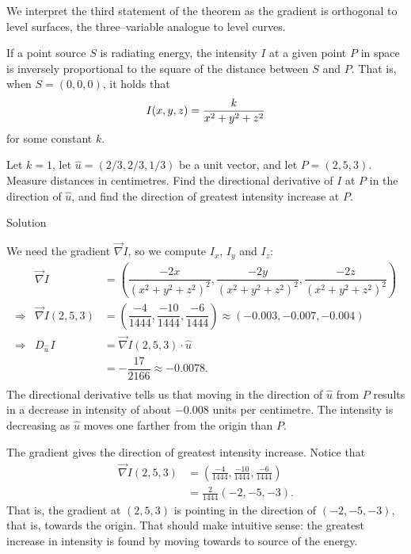 We interpret the third statement of the theorem as the gradient is orthogonal to level surfaces, the three--variable analogue to level curves.



\fi

\begin{example}\label{ex_direct5}
If a point source $S$ is radiating energy, the intensity $I$ at a given point $P$ in space is inversely proportional to the square of the distance between $S$ and $P$. That is, when $S=(0,0,0)$, it holds that \linebreak $$\displaystyle I(x,y,z) = \frac{k}{x^2+y^2+z^2}$$ for some constant $k$.

Let $k=1$, let $\hat u = \left( 2/3, 2/3, 1/3\right)$ be a unit vector, and let $P = (2,5,3).$ Measure distances in centimetres. Find the directional derivative of $I$ at $P$ in the direction of $\hat u$, and find the direction of greatest intensity increase at $P$.

Solution 

We need the gradient $\vec{\nabla} I$, so we compute $I_x$, $I_y$ and $I_z$:
$$\begin{array}{rrl}
&\vec{\nabla} I &= \left( \dfrac{-2x}{(x^2+y^2+z^2)^2},\dfrac{-2y}{(x^2+y^2+z^2)^2},\dfrac{-2z}{(x^2+y^2+z^2)^2}\right)\\[0.2cm]
\Rightarrow &\vec{\nabla} I(2,5,3) &= \left( \dfrac{-4}{1444},\dfrac{-10}{1444},\dfrac{-6}{1444}\right) \approx \left( -0.003,-0.007,-0.004\right)\\[0.2cm]
\Rightarrow &D_{\hat u\,}I &= \vec{\nabla} I(2,5,3)\cdot \hat u\\[0.2cm]
&					&= -\dfrac{17}{2166} \approx -0.0078.\\[0.2cm]
\end{array}$$
The directional derivative tells us that moving in the direction of $\hat u$ from $P$ results in a decrease in intensity of about $-0.008$ units per centimetre. The intensity is decreasing as $\hat u$ moves one farther from the origin than $P$.

The gradient gives the direction of greatest intensity increase. Notice that 
\begin{align*}
\vec{\nabla} I(2,5,3) &= \left( \frac{-4}{1444},\frac{-10}{1444},\frac{-6}{1444}\right)\\
			&= \frac{2}{1444}\left(-2,-5,-3\right).
\end{align*}
That is, the gradient at $(2,5,3)$ is pointing in the direction of $\left( -2,-5,-3\right)$, that is, towards the origin. That should make intuitive sense: the greatest increase in intensity is found by moving towards to source of the energy.
\end{example}

